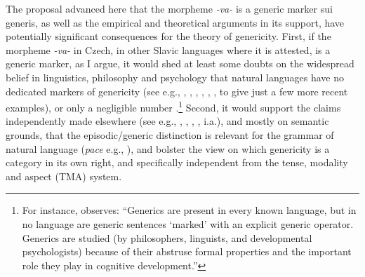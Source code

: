 \documentclass[output=paper,colorlinks,citecolor=brown]{langscibook}
\begin{document}
The proposal advanced here that the morpheme \textit{-va-} is a generic marker sui generis, as well as the empirical and theoretical arguments in its support, 
have potentially significant consequences for the theory of genericity. First, if the morpheme \textit{-va-} in Czech, 
in other Slavic languages where it is attested, 
is a generic marker, as I argue, it would shed at least some doubts on the widespread belief in linguistics, philosophy and psychology that natural languages have no dedicated markers of genericity (see e.g.,  \citealt{leslie2008}, \citealt{Johnston2012}, \citealt{LeslieGelman2012}, \citealt{Rhodes2018}, \citealt{cohen2022}, \citealt{Schiller2023}, to give just a few more recent examples),
or only a negligible number \citep{dahl1995}.\footnote{For instance, \citet[541]{Schiller2023} observes: ``Generics are present in every known language, but in no language are generic sentences `marked' with an explicit generic operator. Generics are studied (by philosophers, linguists, and developmental psychologists) because of their abstruse formal properties and the important role they play in cognitive development.''} 
Second, it would support the claims independently made elsewhere (see e.g., \citealt{carlson1977unified}, \citealt{schubert1989pelletier}, \citealt{filip1997suigenva}, \citealt{pelletier1997generics}, i.a.),
and mostly on semantic grounds, 
that the episodic/generic 
distinction is relevant for the grammar of natural language
(\textit{pace} e.g., \citealt{dahl1995}), 
and bolster the view on which genericity is a category in its own right, 
and specifically independent from the tense, modality and aspect (TMA) system. 



\end{document}
